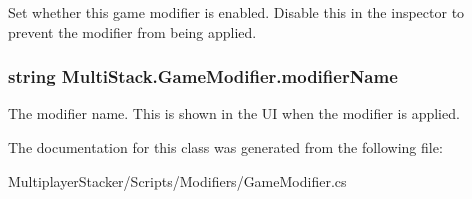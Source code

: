Set whether this game modifier is enabled. Disable this in the inspector to prevent the modifier from being applied. 

\hypertarget{class_multi_stack_1_1_game_modifier_ad998250afe8d90cd438b4777a86e34bb}{}
\subsubsection[{modifier\+Name}]{\setlength{\rightskip}{0pt plus 5cm}string Multi\+Stack.\+Game\+Modifier.\+modifier\+Name}\label{class_multi_stack_1_1_game_modifier_ad998250afe8d90cd438b4777a86e34bb}


The modifier name. This is shown in the U\+I when the modifier is applied. 



The documentation for this class was generated from the following file\+:\begin{DoxyCompactItemize}
\item 
Multiplayer\+Stacker/\+Scripts/\+Modifiers/Game\+Modifier.\+cs\end{DoxyCompactItemize}
